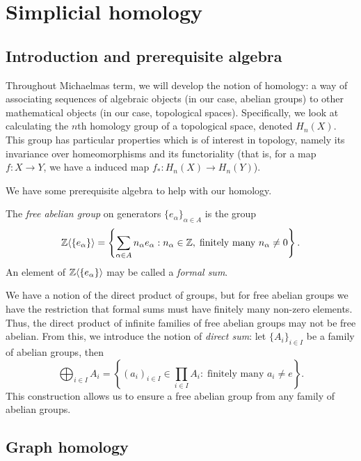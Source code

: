 \section{Simplicial homology}

\subsection{Introduction and prerequisite algebra}

Throughout Michaelmas term, we will develop the notion of homology: a way of associating sequences of algebraic objects (in our case, abelian groups) to other mathematical objects (in our case, topological spaces). Specifically, we look at calculating the $n$th homology group of a topological space, denoted $H_n(X)$. This group has particular properties which is of interest in topology, namely its invariance over homeomorphisms and its functoriality (that is, for a map $f:X \to Y$, we have a induced map $f_*: H_n(X) \to H_n(Y)$).

We have some prerequisite algebra to help with our homology.

\begin{definition}
  The \emph{free abelian group} on generators $\{e_\alpha\}_{\alpha \in A}$ is the group
  \[ \mathbb{Z}\langle \{e_\alpha\}\rangle = \left\{\sum_{\alpha \in A} n_\alpha e_\alpha: n_\alpha \in \mathbb{Z},\;\text{finitely many $n_\alpha \neq 0$}\right\}. \]
  An element of $\mathbb{Z}\langle\{e_\alpha\}\rangle$ may be called a \emph{formal sum}.
\end{definition}


We have a notion of the direct product of groups, but for free abelian groups we have the restriction that formal sums must have finitely many non-zero elements. Thus, the direct product of infinite families of free abelian groups may not be free abelian. From this, we introduce the notion of \emph{direct sum}: let $\{A_i\}_{i \in I}$ be a family of abelian groups, then
\[ \bigoplus_{i \in I} A_i = \left\{(a_i)_{i \in I} \in \prod_{i \in I} A_i: \;\text{finitely many $a_i \neq e$}\right\}. \]
This construction allows us to ensure a free abelian group from any family of abelian groups.

\subsection{Graph homology}

